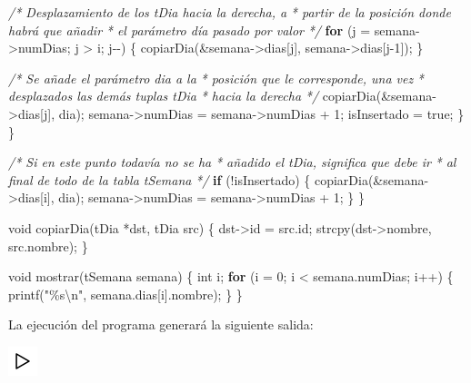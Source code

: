 \documentclass[
]{book}
\newenvironment{Shaded}{\begin{snugshade}}{\end{snugshade}}
\newcommand{\CommentTok}[1]{\textcolor[rgb]{0.56,0.35,0.01}{\textit{#1}}}
\newcommand{\ControlFlowTok}[1]{\textcolor[rgb]{0.13,0.29,0.53}{\textbf{#1}}}
\newcommand{\DataTypeTok}[1]{\textcolor[rgb]{0.13,0.29,0.53}{#1}}
\newcommand{\DecValTok}[1]{\textcolor[rgb]{0.00,0.00,0.81}{#1}}
\newcommand{\NormalTok}[1]{#1}
\newcommand{\SpecialCharTok}[1]{\textcolor[rgb]{0.00,0.00,0.00}{#1}}
\newcommand{\StringTok}[1]{\textcolor[rgb]{0.31,0.60,0.02}{#1}}
\begin{document}
\begin{Shaded}
\begin{Highlighting}[]
            \CommentTok{/* Desplazamiento de los tDia hacia la derecha, a}
\CommentTok{             * partir de la posición donde habrá que añadir}
\CommentTok{             * el parámetro día pasado por valor}
\CommentTok{             */}
            \ControlFlowTok{for}\NormalTok{ (j = semana{-}\textgreater{}numDias; j \textgreater{} i; j{-}{-}) \{}
\NormalTok{                copiarDia(\&semana{-}\textgreater{}dias[j], semana{-}\textgreater{}dias[j{-}}\DecValTok{1}\NormalTok{]);    }
\NormalTok{            \}}
            
            \CommentTok{/* Se añade el parámetro dia a la}
\CommentTok{             * posición que le corresponde, una vez}
\CommentTok{             * desplazados las demás tuplas tDia}
\CommentTok{             * hacia la derecha}
\CommentTok{             */}
\NormalTok{            copiarDia(\&semana{-}\textgreater{}dias[j], dia);}
\NormalTok{            semana{-}\textgreater{}numDias = semana{-}\textgreater{}numDias + }\DecValTok{1}\NormalTok{;}
\NormalTok{            isInsertado = true;}
\NormalTok{        \}}
\NormalTok{    \}}

    \CommentTok{/* Si en este punto todavía no se ha}
\CommentTok{     * añadido el tDia, significa que debe ir}
\CommentTok{     * al final de todo de la tabla tSemana}
\CommentTok{     */}
    \ControlFlowTok{if}\NormalTok{ (!isInsertado) \{}
\NormalTok{        copiarDia(\&semana{-}\textgreater{}dias[i], dia);}
\NormalTok{        semana{-}\textgreater{}numDias = semana{-}\textgreater{}numDias + }\DecValTok{1}\NormalTok{;}
\NormalTok{    \}}
\NormalTok{\}}

\DataTypeTok{void}\NormalTok{ copiarDia(tDia *dst, tDia src) \{    }
\NormalTok{    dst{-}\textgreater{}id = src.id; }
\NormalTok{    strcpy(dst{-}\textgreater{}nombre, src.nombre);}
\NormalTok{\}}

\DataTypeTok{void}\NormalTok{ mostrar(tSemana semana) \{}
    \DataTypeTok{int}\NormalTok{ i;}
    \ControlFlowTok{for}\NormalTok{ (i = }\DecValTok{0}\NormalTok{; i \textless{} semana.numDias; i++) \{}
\NormalTok{        printf(}\StringTok{"\%s}\SpecialCharTok{\textbackslash{}n}\StringTok{"}\NormalTok{, semana.dias[i].nombre);}
\NormalTok{    \}}
\NormalTok{\}}
\end{Highlighting}
\end{Shaded}

La ejecución del programa generará la siguiente salida:

\includegraphics{./img/play.png}
\end{document}
